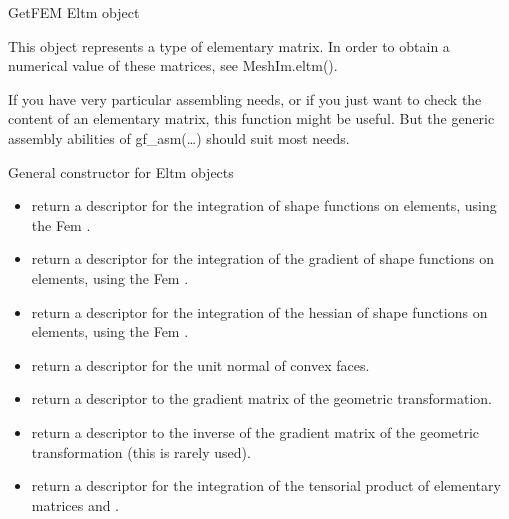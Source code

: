 \documentclass[a4paper,11pt,english]{sphinxmanual}
\begin{document}
\begin{fulllineitems}
\label{\detokenize{python/cmdref_Eltm:getfem.Eltm}}
GetFEM Eltm object

This object represents a type of elementary matrix. In order to obtain a
numerical value of these matrices, see MeshIm.eltm().

If you have very particular assembling needs, or if you just want to check
the content of an elementary matrix, this function might be useful. But
the generic assembly abilities of gf\_asm(…) should suit most needs.

General constructor for Eltm objects
\begin{itemize}
\item {} 
return a descriptor for the integration of shape functions on
elements, using the Fem .

\item {} 
return a descriptor for the integration of the gradient of shape
functions on elements, using the Fem .

\item {} 
return a descriptor for the integration of the hessian of shape
functions on elements, using the Fem .

\item {} 
return a descriptor for the unit normal of convex faces.

\item {} 
return a descriptor to the gradient matrix of the geometric
transformation.

\item {} 
return a descriptor to the inverse of the gradient matrix of the
geometric transformation (this is rarely used).

\item {} 
return a descriptor for the integration of the tensorial product of
elementary matrices  and .

\end{itemize}

\end{fulllineitems}
\end{document}

